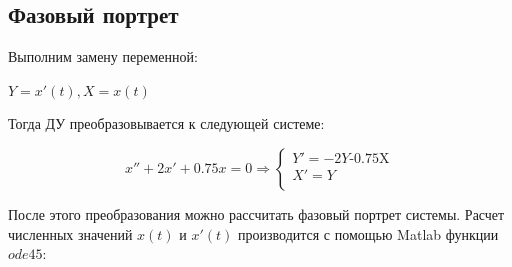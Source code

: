 \documentclass[14pt,a4paper,report]{report}
\begin{document}
\subsection{Фазовый портрет}

Выполним замену переменной:

$Y=x'(t), X=x(t)$


Тогда ДУ преобразовывается к следующей системе:

\begin{equation*}
	\text{$x''+2x'+0.75x=0$}
	\Longrightarrow
	\begin{cases}
		\text{$Y'=-2Y$-0.75X} \\
		\text{$X'=Y$} \\
	\end{cases}
\end{equation*}

После этого преобразования можно рассчитать фазовый портрет системы. Расчет численных значений $x(t)$ и $x'(t)$ производится с помощью Matlab функции $ode45$:



\end{document}

